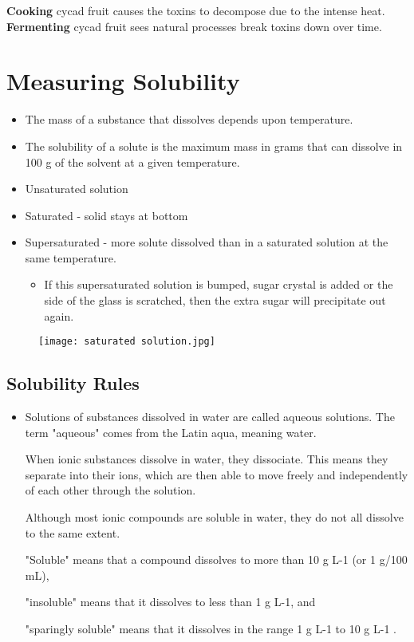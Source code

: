 		\textbf{Cooking} cycad fruit causes the toxins to decompose due to the intense heat.
		\textbf{Fermenting} cycad fruit sees natural processes break toxins down over time.

\section{Measuring Solubility} \label{20/11/2024}
	\begin{itemize}
		\item The mass of a substance that dissolves depends upon temperature.
		\item The solubility of a solute is the maximum mass in grams that can dissolve in 100 g of the solvent at a given temperature.
		\item Unsaturated solution
		\item Saturated - solid stays at bottom
		\item Supersaturated - more solute dissolved than in a saturated solution at the same temperature.
		\begin{itemize}
			\item If this supersaturated solution is bumped, sugar crystal is added or the side of the glass is scratched, then the extra sugar will precipitate out again.
		\end{itemize}
	\end{itemize}

	\begin{figure}[H]
		\centering
		\texttt{[image: saturated solution.jpg]}
	\end{figure}

	\subsection{Solubility Rules}
		\begin{itemize}
			\item Solutions of substances dissolved in water are called aqueous solutions. The term "aqueous" comes from the Latin aqua, meaning water.
			
			When ionic substances dissolve in water, they dissociate. This means they separate into their ions, which are then able to move freely and independently of each other through the solution.
			
			Although most ionic compounds are soluble in water, they do not all dissolve to the
			same extent.
			
			"Soluble" means that a compound dissolves to more than 10 g L-1 (or 1 g/100 mL),
			
			"insoluble" means that it dissolves to less than 1 g L-1, and
			
			"sparingly soluble" means that it dissolves in the range 1 g L-1 to 10 g L-1 .
		\end{itemize}
